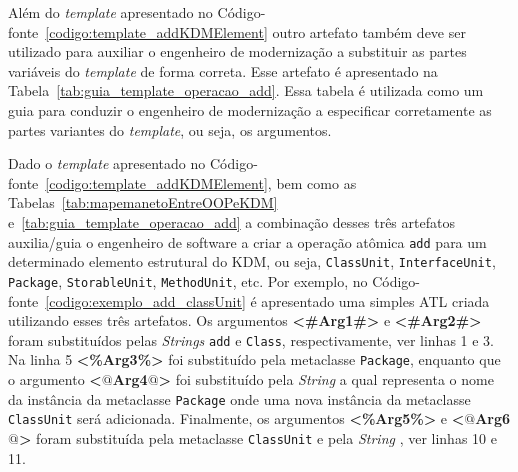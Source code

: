 

Além do \textit{template} apresentado no Código-fonte~\ref{codigo:template_addKDMElement} outro artefato também deve ser utilizado para auxiliar o engenheiro de modernização a substituir as partes variáveis do \textit{template} de forma correta. Esse artefato é apresentado na Tabela~\ref{tab:guia_template_operacao_add}. Essa tabela é utilizada como um guia para conduzir o engenheiro de modernização a especificar corretamente as partes variantes do \textit{template}, ou seja, os argumentos.

Dado o \textit{template} apresentado no Código-fonte~\ref{codigo:template_addKDMElement}, bem como as Tabelas~\ref{tab:mapemanetoEntreOOPeKDM} e~\ref{tab:guia_template_operacao_add} a combinação desses três artefatos auxilia/guia o engenheiro de software a criar a operação atômica \texttt{add} para um determinado elemento estrutural do KDM, ou seja, \texttt{ClassUnit}, \texttt{InterfaceUnit}, \texttt{Package}, \texttt{StorableUnit}, \texttt{MethodUnit}, etc. Por exemplo, 
%
%
%
%
%
no Código-fonte~\ref{codigo:exemplo_add_classUnit} é apresentado uma simples ATL criada utilizando esses três artefatos. Os argumentos \textbf{<\#Arg1\#>} e \textbf{<\#Arg2\#>} foram substituídos pelas \textit{Strings} \texttt{add} e \texttt{Class}, respectivamente, ver linhas 1 e 3. Na linha 5 \textbf{<\%Arg3\%>} foi substituído pela metaclasse \texttt{Package}, enquanto que o argumento \textbf{<$@$Arg4$@$>} foi substituído pela \textit{String} \texttt{} a qual representa o nome da instância da metaclasse \texttt{Package} onde uma nova instância da metaclasse \texttt{ClassUnit} será adicionada. Finalmente, os argumentos \textbf{<\%Arg5\%>} e \textbf{<$@$Arg6$@$>} foram substituída pela metaclasse \texttt{ClassUnit} e pela \textit{String} \texttt{}, ver linhas 10 e 11.

